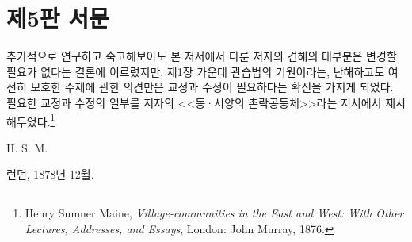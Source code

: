 \chapter*{제5판 서문}

추가적으로 연구하고 숙고해보아도
본 저서에서 다룬 저자의 견해의 대부분은
변경할 필요가 없다는 결론에 이르렀지만,
제1장 가운데
관습법의 기원이라는, 난해하고도 여전히 모호한 주제에 관한 의견만은
교정과 수정이 필요하다는 확신을 가지게 되었다.
필요한 교정과 수정의 일부를
저자의
<<동^^b7서양의 촌락공동체>>라는
저서에서 제시해두었다.\footnote{%
  \latinmarks
  Henry Sumner Maine,
  \textit{Village-communities in the East and West: With Other Lectures,
  Addresses, and Essays},
  London: John Murray, 1876. }

\begin{flushright}
H. S. M.
\end{flushright}

\begin{footnotesize}
런던, 1878년 12월.
\end{footnotesize}

